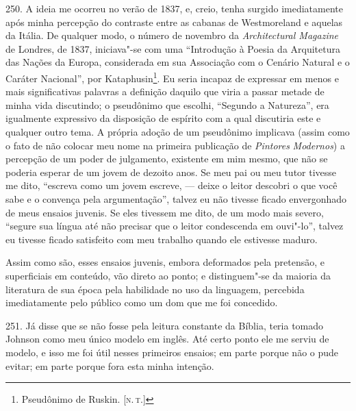 250. A ideia me ocorreu no verão de 1837, e, creio, tenha surgido
imediatamente após minha percepção do contraste entre as cabanas de
Westmoreland e aquelas da Itália. De qualquer modo, o número de novembro
da \emph{Architectural Magazine} de Londres, de 1837, iniciava"-se com
uma ``Introdução à Poesia da Arquitetura das Nações da Europa,
considerada em sua Associação com o Cenário Natural e o Caráter
Nacional'', por Kataphusin\footnote{Pseudônimo de Ruskin. {[}\textsc{n.\,t.}{]}}.
Eu seria incapaz de expressar em menos e mais significativas palavras a
definição daquilo que viria a passar metade de minha vida discutindo; o
pseudônimo que escolhi, ``Segundo a Natureza'', era igualmente
expressivo da disposição de espírito com a qual discutiria este e
qualquer outro tema. A própria adoção de um pseudônimo implicava (assim
como o fato de não colocar meu nome na primeira publicação de
\emph{Pintores} \emph{Modernos}) a percepção de um poder de julgamento,
existente em mim mesmo, que não se poderia esperar de um jovem de
dezoito anos. Se meu pai ou meu tutor tivesse me dito, ``escreva como um
jovem escreve, --- deixe o leitor descobri o que você sabe e o convença
pela argumentação'', talvez eu não tivesse ficado envergonhado de meus
ensaios juvenis. Se eles tivessem me dito, de um modo mais severo,
``segure sua língua até não precisar que o leitor condescenda em
ouvi"-lo'', talvez eu tivesse ficado satisfeito com meu trabalho quando
ele estivesse maduro.

Assim como são, esses ensaios juvenis, embora deformados pela pretensão,
e superficiais em conteúdo, vão direto ao ponto; e distinguem"-se da
maioria da literatura de sua época pela habilidade no uso da linguagem,
percebida imediatamente pelo público como um dom que me foi concedido.

251. Já disse que se não fosse pela leitura constante da Bíblia, teria
tomado Johnson como meu único modelo em inglês. Até certo ponto ele me
serviu de modelo, e isso me foi útil nesses primeiros ensaios; em parte
porque não o pude evitar; em parte porque fora esta minha intenção.

